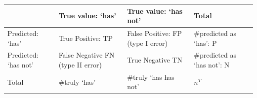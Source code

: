 \documentclass[12pt,]{krantz}
\begin{document}
\begin{longtable}[]{@{}llll@{}}
\toprule
\begin{minipage}[b]{0.17\columnwidth}\raggedright
\strut
\end{minipage} & \begin{minipage}[b]{0.26\columnwidth}\raggedright
True value: `has'\strut
\end{minipage} & \begin{minipage}[b]{0.26\columnwidth}\raggedright
True value: `has not'\strut
\end{minipage} & \begin{minipage}[b]{0.20\columnwidth}\raggedright
Total\strut
\end{minipage}\tabularnewline
\midrule
\endhead
\begin{minipage}[t]{0.17\columnwidth}\raggedright
Predicted: `has'\strut
\end{minipage} & \begin{minipage}[t]{0.26\columnwidth}\raggedright
True Positive: TP\strut
\end{minipage} & \begin{minipage}[t]{0.26\columnwidth}\raggedright
False Positive: FP (type I error)\strut
\end{minipage} & \begin{minipage}[t]{0.20\columnwidth}\raggedright
\#predicted as `has': P\strut
\end{minipage}\tabularnewline
\begin{minipage}[t]{0.17\columnwidth}\raggedright
Predicted: `has not'\strut
\end{minipage} & \begin{minipage}[t]{0.26\columnwidth}\raggedright
False Negative FN (type II error)\strut
\end{minipage} & \begin{minipage}[t]{0.26\columnwidth}\raggedright
True Negative TN\strut
\end{minipage} & \begin{minipage}[t]{0.20\columnwidth}\raggedright
\#predicted as `has not': N\strut
\end{minipage}\tabularnewline
\begin{minipage}[t]{0.17\columnwidth}\raggedright
Total\strut
\end{minipage} & \begin{minipage}[t]{0.26\columnwidth}\raggedright
\#truly `has'\strut
\end{minipage} & \begin{minipage}[t]{0.26\columnwidth}\raggedright
\#truly `has has not'\strut
\end{minipage} & \begin{minipage}[t]{0.20\columnwidth}\raggedright
\(n^T\)\strut
\end{minipage}\tabularnewline
\bottomrule
\end{longtable}
\end{document}
